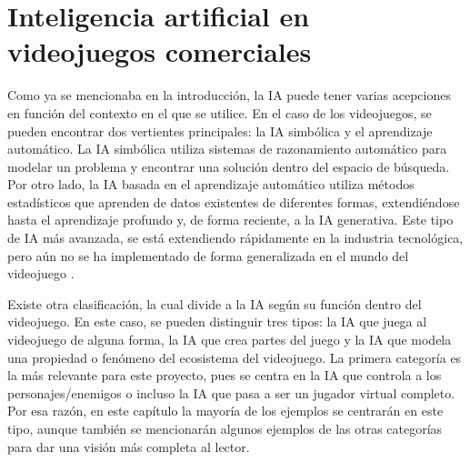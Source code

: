 \section{Inteligencia artificial en videojuegos comerciales} \label{sec:ia_videojuegos}

Como ya se mencionaba en la introducción, la IA puede tener varias acepciones en función del contexto en el que se utilice. En el caso de los videojuegos, se pueden encontrar dos vertientes principales: la IA simbólica y el aprendizaje automático. La IA simbólica utiliza sistemas de razonamiento automático para modelar un problema y encontrar una solución dentro del espacio de búsqueda. Por otro lado, la IA basada en el aprendizaje automático utiliza métodos estadísticos que aprenden de datos existentes de diferentes formas, extendiéndose hasta el aprendizaje profundo y, de forma reciente, a la IA generativa. Este tipo de IA más avanzada, se está extendiendo rápidamente en la industria tecnológica, pero aún no se ha implementado de forma generalizada en el mundo del videojuego \cite{thompson_how_2025}.

Existe otra clasificación, la cual divide a la IA según su función dentro del videojuego. En este caso, se pueden distinguir tres tipos: la IA que juega al videojuego de alguna forma, la IA que crea partes del juego y la IA que modela una propiedad o fenómeno del ecosistema del videojuego. La primera categoría es la más relevante para este proyecto, pues se centra en la IA que controla a los personajes/enemigos o incluso la IA que pasa a ser un jugador virtual completo. Por esa razón, en este capítulo la mayoría de los ejemplos se centrarán en este tipo, aunque también se mencionarán algunos ejemplos de las otras categorías para dar una visión más completa al lector.


